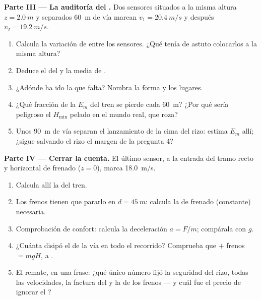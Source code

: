 \begin{problem}
\medskip
\noindent\textbf{Parte III --- La auditoría del .}
Dos sensores situados a la misma altura $z = \qty{2.0}{m}$ y separados
\qty{60}{m} de vía marcan $v_1 = \qty{20.4}{m/s}$ y después
$v_2 = \qty{19.2}{m/s}$.
\begin{enumerate}[resume]
  \item Calcula la variación de  entre los sensores.
        ¿Qué tenía de astuto colocarlos a la misma altura?
  \item Deduce el  del  y la  media de
        .
  \item ¿Adónde ha ido la  que falta? Nombra la forma y los
        lugares.
  \item ¿Qué fracción de la $E_m$ del tren se pierde cada \qty{60}{m}?
        ¿Por qué sería peligroso el $H_{\min}$ pelado en el mundo real,
        que roza?
  \item Unos \qty{90}{m} de vía separan el lanzamiento de la cima del
        rizo: estima $E_m$ allí; ¿sigue salvando el rizo el margen de la
        pregunta 4?
\end{enumerate}

\medskip
\noindent\textbf{Parte IV --- Cerrar la cuenta.}
El último sensor, a la entrada del tramo recto y horizontal de frenado
($z = 0$), marca \qty{18.0}{m/s}.
\begin{enumerate}[resume]
  \item Calcula allí la  del tren.
  \item Los frenos tienen que pararlo en $d = \qty{45}{m}$: calcula la
         de frenado (constante) necesaria.
  \item Comprobación de confort: calcula la deceleración $a = F/m$;
        compárala con $g$.
  \item ¿Cuánta  disipó el  de la vía en todo el
        recorrido? Comprueba que  $+$ frenos $= mgH$,  a
        .
  \item El remate, en una frase: ¿qué único número fijó la seguridad del
        rizo, todas las velocidades, la factura del  y la
         de los frenos --- y cuál fue el precio de ignorar el
        ?
\end{enumerate}
\end{problem}
